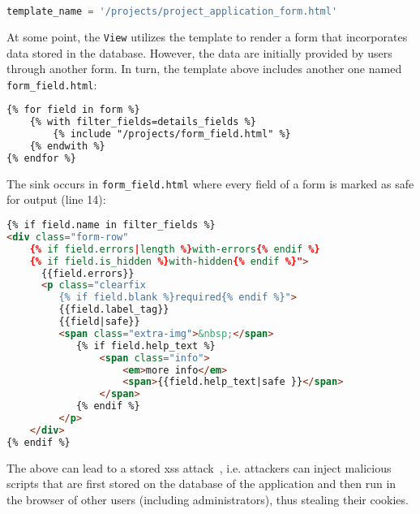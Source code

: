 \vspace{0.8mm}
\begin{lstlisting}[language=Python, basicstyle=\footnotesize\ttfamily]
 template_name = '/projects/project_application_form.html'
\end{lstlisting}
\vspace{0.8mm}

\noindent
At some point,
the {\tt View} utilizes the template to render a form
that incorporates data stored in the database.
However,
the data are initially provided by users
through another form.
In turn,
the template above
includes another one named
{\tt form\_field.html}:

\vspace{0.8mm}
\begin{lstlisting}[language=html,basicstyle=\footnotesize\ttfamily]
{% for field in form %}
    {% with filter_fields=details_fields %}
        {% include "/projects/form_field.html" %}
    {% endwith %}
{% endfor %}
\end{lstlisting}
\vspace{0.8mm}

\noindent
The sink occurs in {\tt form\_field.html}
where every field of a form is marked as safe
for output (line 14):

\vspace{0.8mm}
\begin{lstlisting}[language=html,basicstyle=\footnotesize\ttfamily]
{% if field.name in filter_fields %}
<div class="form-row"
    {% if field.errors|length %}with-errors{% endif %}
    {% if field.is_hidden %}with-hidden{% endif %}">
      {{field.errors}}
      <p class="clearfix
         {% if field.blank %}required{% endif %}">
         {{field.label_tag}}
         {{field|safe}}
         <span class="extra-img">&nbsp;</span>
            {% if field.help_text %}
                <span class="info">
                    <em>more info</em>
                    <span>{{field.help_text|safe }}</span>
                </span>
            {% endif %}
         </p>
    </div>
{% endif %}
\end{lstlisting}
\vspace{0.8mm}

\noindent
The above can lead to a stored {\sc xss} attack~\cite{MLPK17},
i.e. attackers can inject malicious scripts
that are first stored on the database
of the application
and then run in the browser of other users
(including administrators),
thus stealing their cookies.


